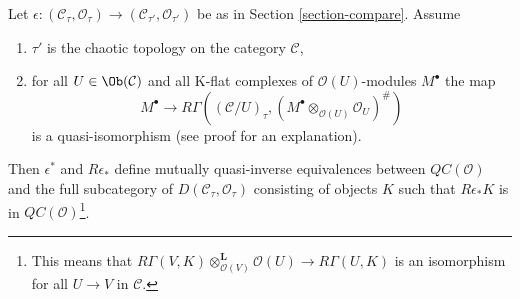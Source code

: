 \begin{lemma}
\label{lemma-cartesion-plus-topology}
Let $\epsilon : (\mathcal{C}_\tau, \mathcal{O}_\tau) \to
(\mathcal{C}_{\tau'}, \mathcal{O}_{\tau'})$ be as in
Section \ref{section-compare}. Assume
\begin{enumerate}
\item $\tau'$ is the chaotic topology on the category $\mathcal{C}$,
\item for all $U \in \Ob(\mathcal{C})$ and all K-flat complexes of
$\mathcal{O}(U)$-modules $M^\bullet$ the map
$$
M^\bullet \longrightarrow
R\Gamma((\mathcal{C}/U)_\tau,
(M^\bullet \otimes_{\mathcal{O}(U)} \mathcal{O}_U)^\#)
$$
is a quasi-isomorphism (see proof for an explanation).
\end{enumerate}
Then $\epsilon^*$ and $R\epsilon_*$ define mutually quasi-inverse
equivalences between $\mathit{QC}(\mathcal{O})$ and
the full subcategory of $D(\mathcal{C}_\tau, \mathcal{O}_\tau)$
consisting of objects $K$ such that $R\epsilon_*K$ is in
$\mathit{QC}(\mathcal{O})$\footnote{This means that
$R\Gamma(V, K) \otimes_{\mathcal{O}(V)}^\mathbf{L} \mathcal{O}(U)
\to R\Gamma(U, K)$ is an isomorphism for all $U \to V$ in $\mathcal{C}$.}.
\end{lemma}

